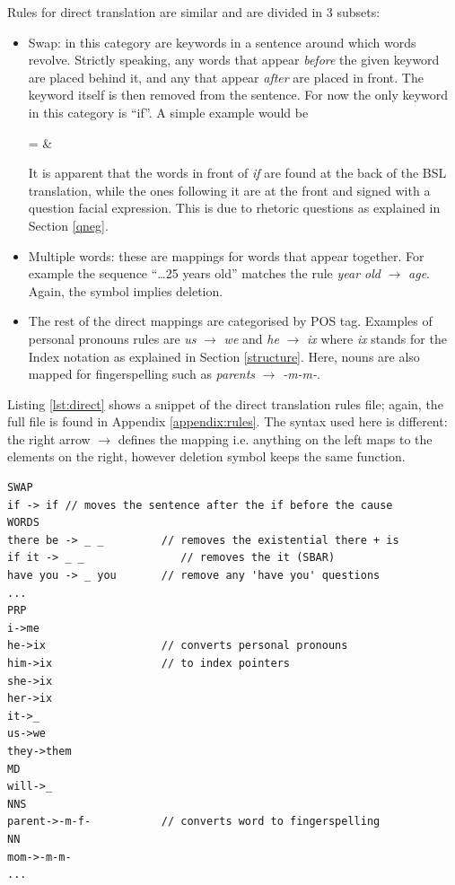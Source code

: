 \documentclass[12pt]{ociamthesis}  %
\newcommand{\nothing}{\text{\rule{1.5ex}{0.4pt}\;}}
\begin{document}
Rules for direct translation are similar and are divided in 3 subsets:
\begin{itemize}
	\item Swap: in this category are keywords in a sentence around which words revolve. Strictly speaking, any words that appear \textit{before} the given keyword are placed behind it, and any that appear \textit{after} are placed in front. The keyword itself is then removed from the sentence. For now the only keyword in this category is ``if''. A simple example would be
	\begin{flalign*}
	 = &  \tag{$\ast$}
	\end{flalign*}
	It is apparent that the words in front of \textit{if} are found at the back of the BSL translation, while the ones following it are at the front and signed with a question facial expression. This is due to rhetoric questions as explained in Section \ref{qneg}.
	\item Multiple words: these are mappings for words that appear together. For example the sequence ``\ldots 25 years old'' matches the rule \textit{year old} $\rightarrow$ \nothing \textit{age}. Again, the \nothing symbol implies deletion.
	\item The rest of the direct mappings are categorised by POS tag. Examples of personal pronouns rules are  \textit{us} $\rightarrow$ \textit{we} and \textit{he} $\rightarrow$ \textit{ix} where \textit{ix} stands for the Index notation as explained in Section \ref{structure}. Here, nouns are also mapped for fingerspelling such as \textit{parents} $\rightarrow$ \textit{-m-m-}.
\end{itemize}
Listing \ref{lst:direct} shows a  snippet of the direct translation rules file; again, the full file is found in Appendix \ref{appendix:rules}. The syntax used here is different: the right arrow $\rightarrow$ defines the mapping i.e. anything on the left maps to the elements on the right, however deletion symbol \nothing keeps the same function.
\begin{lstlisting}[language=Rules2,mathescape=true, caption = Direct translation rules snippet, label = lst:direct]
SWAP
if -> if // moves the sentence after the if before the cause
WORDS
there be -> _ _         // removes the existential there + is
if it -> _ _	           // removes the it (SBAR)
have you -> _ you       // remove any 'have you' questions
...
PRP
i->me
he->ix                  // converts personal pronouns
him->ix                 // to index pointers
she->ix
her->ix
it->_
us->we
they->them
MD
will->_
NNS
parent->-m-f-           // converts word to fingerspelling
NN
mom->-m-m-
...
\end{lstlisting}
\end{document}
